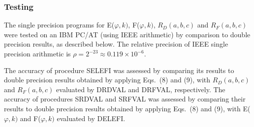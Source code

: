 \documentclass[twoside]{MATH77}
\begin{document}
%
\subsubsection{Testing}

The single precision programs for E($\varphi ,k)$, F($\varphi ,k)$, $%
R_D(a,b,c)$ and $R_F(a,b,c)$ were tested on an IBM PC/AT (using IEEE
arithmetic) by comparison to double precision results, as described below.
The relative precision of IEEE single precision arithmetic is $\rho =
2^{-23} \approx 0.119\times 10^{-6}.$

The accuracy of procedure SELEFI was assessed by comparing its results to
double precision results obtained by applying  Eqs.~(8) and (9), with $%
R_D(a,b,c)$ and $R_F(a,b,c)$ evaluated by DRDVAL and DRFVAL, respectively.
The accuracy of procedures SRDVAL and SRFVAL was assessed by comparing their
results to double precision results obtained by applying Eqs.~(8) and (9),
with E($\varphi ,k)$ and F($\varphi ,k)$ evaluated by DELEFI.
\end{document}
